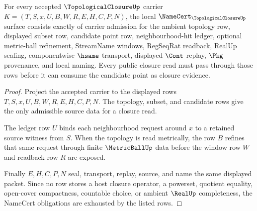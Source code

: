 \begin{theorem}
\label{thm:topological-closure-namecert-obligations}
For every accepted $\TopologicalClosureUp$ carrier $K=(T,S,x,U,B,W,R,E,H,C,P,N)$, the local $\NameCert_{\TopologicalClosureUp}$ surface consists exactly of carrier admission for the ambient topology row, displayed subset row, candidate point row, neighbourhood-hit ledger, optional metric-ball refinement, StreamName windows, RegSeqRat readback, RealUp sealing, componentwise $\hsame$ transport, displayed $\Cont$ replay, $\Pkg$ provenance, and local naming. Every public closure read must pass through those rows before it can consume the candidate point as closure evidence.
\end{theorem}
\begin{proof}
Project the accepted carrier to the displayed rows $T,S,x,U,B,W,R,E,H,C,P,N$. The topology, subset, and candidate rows give the only admissible source data for a closure read.

The ledger row $U$ binds each neighbourhood request around $x$ to a retained source witness from $S$. When the topology is read metrically, the row $B$ refines that same request through finite $\MetricBallUp$ data before the window row $W$ and readback row $R$ are exposed.

Finally $E,H,C,P,N$ seal, transport, replay, source, and name the same displayed packet. Since no row stores a host closure operator, a powerset, quotient equality, open-cover compactness, countable choice, or ambient $\RealUp$ completeness, the NameCert obligations are exhausted by the listed rows.
\end{proof}

